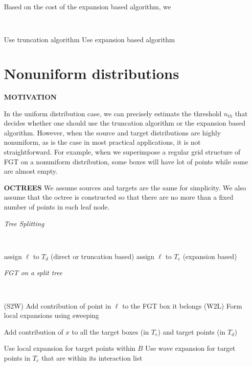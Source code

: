 \documentclass[conference]{IEEEtran}
\begin{document}
Based on the cost of the expansion based algorithm, we 

{\tt
\begin{algorithmic}
\STATE
     \STATE Use truncation algorithm 
  \ELSE 
     \STATE Use expansion based algorithm
  \ENDIF
\STATE
\end{algorithmic}
}



\section{Nonuniform distributions} 

{\bf MOTIVATION}

In the uniform distribution case, we can precisely estimate the threshold $n_{th}$ that decides whether one should use the truncation algorithm or the expansion based algorithm. However, when the source and target distributions are highly nonuniform, as is the case in most practical applications, it is not straightforward. For example, when we superimpose a regular grid structure of FGT on a nonuniform distribution, some boxes will have lot of points while some are almost empty. 

%

{\bf OCTREES}
We assume sources and targets are the same for simplicity. We also assume that the octree is constructed so that there are no more than a fixed number of points in each leaf node. 

\begin{algorithm}[!h]
\caption{{\em Tree Splitting}}
{\tt
\begin{algorithmic}
\STATE
      \IF {$|\ell| > \sqrt{\delta}$}
          \STATE assign $\ell$ to $T_d$ (direct or truncation based)
      \ELSE
          \STATE assign $\ell$ to $T_e$ (expansion based)
      \ENDIF
  \ENDFOR
\STATE
\end{algorithmic}
}
\end{algorithm}


\begin{algorithm}[!h]
\caption{\em FGT on a split tree}
{\tt
\begin{algorithmic}
\STATE
      \STATE (S2W) Add contribution of point in $\ell$ to the FGT box it belongs
  \ENDFOR
  \STATE
  \STATE (W2L) Form local expansions using sweeping
  \STATE 

          \STATE Add contribution of $x$ to all the target boxes (in $T_e$) and target points (in $T_d$)     
       \ENDFOR  
  \ENDFOR
  
  \STATE 
        \STATE Use local expansion for target points within $B$ 
        \STATE
        \STATE Use wave expansion for target points in $T_e$ that are within its interaction list
     \ENDFOR  
\STATE
\end{algorithmic}
}
\end{algorithm}
\end{document}
